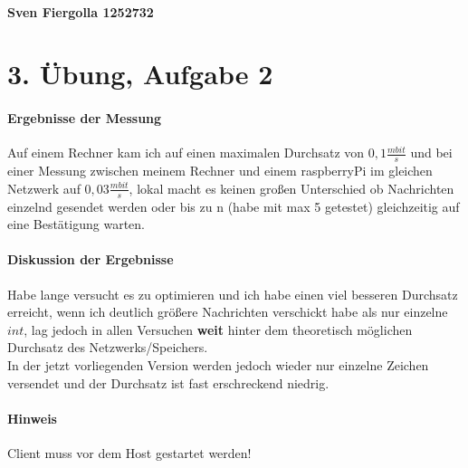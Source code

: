 \documentclass[12pt, a4paper]{article}
\begin{document}
\paragraph{Sven Fiergolla 1252732}
\section*{3. Übung, Aufgabe 2}
\paragraph{Ergebnisse der Messung}
Auf einem Rechner kam ich auf einen maximalen Durchsatz von $0,1 \frac{mbit}{s}$ und bei einer Messung zwischen meinem Rechner und einem raspberryPi im gleichen Netzwerk auf $0,03 \frac{mbit}{s}$, lokal macht es keinen großen Unterschied ob Nachrichten einzelnd gesendet werden oder bis zu n (habe mit max 5 getestet) gleichzeitig auf eine Bestätigung warten.\par
\paragraph{Diskussion der Ergebnisse}
Habe lange versucht es zu optimieren und ich habe einen viel besseren Durchsatz erreicht, wenn ich deutlich größere Nachrichten verschickt habe als nur einzelne $int$, lag jedoch in allen Versuchen \textbf{weit} hinter dem theoretisch möglichen Durchsatz des Netzwerks/Speichers.\\
In der jetzt vorliegenden Version werden jedoch wieder nur einzelne Zeichen versendet und der Durchsatz ist fast erschreckend niedrig.\par



\paragraph{Hinweis}
Client muss vor dem Host gestartet werden!
\end{document}
